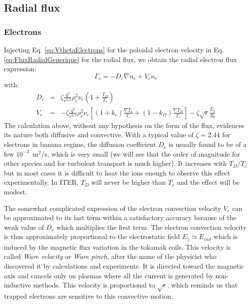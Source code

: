 				\subsection{Radial flux}
				\label{sec:FluxRadial}

						\subsubsection{Electrons}
						\label{sec:FluxRadialElectrons}


Injecting Eq. \ref{eq:VthetaElectrons} for the poloidal electron velocity in Eq. \ref{eq:FluxRadialGenerique} for the radial flux, we obtain the radial electron flux expression:
\begin{equation}
		\Gamma_e = - D_e\nabla n_e + V_e n_e
\end{equation}
with:
\begin{eqnarray}
		D_e	&	=	&	\zeta\frac{q^2}{\epsilon^{3/2}}\rho_e^2\nu_e \left( 1 + \frac{T_D}{T_e} \right)			\\
		V_e	&	=	&	-\zeta\frac{q^2}{\epsilon^{3/2}}\rho_e^2\nu_e \left[ \left( 1+k_e \right)\frac{\nabla T_e}{T_e} + \left( 1-k_D \right)\frac{\nabla T_D}{T_e} \right] - \zeta \sqrt{\epsilon}\frac{E_\|}{B_\theta} 
\end{eqnarray}
The calculation above, without any hypothesis on the form of the flux, evidences its nature both diffusive and convective. With a typical value of $\zeta = 2.44$ for electrons in banana regime, the diffusion coefficient $D_e$ is usually found to be of a few $10^{-3}$~m$^2$/s, which is very small (we will see that the order of magnitude for other species and for turbulent transport is much higher). It increases with $T_D/T_e$ but in most cases it is difficult to heat the ions enough to observe this effect experimentally. In ITER, $T_D$ will never be higher than $T_e$ and the effect will be modest. 

The somewhat complicated expression of the electron convection velocity $V_e$ can be approximated to its last term within a satisfactory accuracy because of the weak value of $D_e$ which multiplies the first term. The electron convection velocity is thus approximately proportional to the electrostatic field $E_\| \simeq E_{ind}$ which is induced by the magnetic flux variation in the tokamak coils. This velocity is called \textit{Ware velocity} or \textit{Ware pinch}, after the name of the physicist who discovered it by calculations and experiments. It is directed toward the magnetic axis and cancels only on plasmas where all the current is generated by non-inductive methods. This velocity is proportional to $\sqrt{\epsilon}$, which reminds us that trapped electrons are sensitive to this convective motion.


